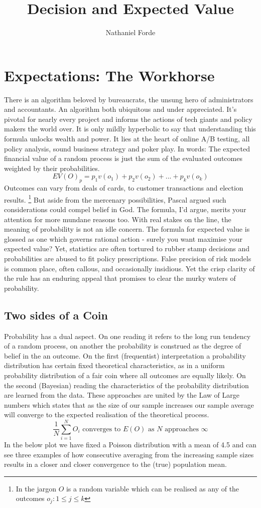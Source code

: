 \documentclass[10pt,a4paper,notitlepage, twocolumn]{article}
\author{Nathaniel Forde}
\title{Decision and Expected Value}
\begin{document}
\section*{Expectations: The Workhorse}
There is an algorithm beloved by bureaucrats, the unsung hero of administrators and accountants. An algorithm  both ubiquitous and under appreciated. It's pivotal for nearly every project and informs the actions of tech giants and policy makers the world over. It is only mildly hyperbolic to say that understanding this formula unlocks wealth and power. It lies at the heart of online A/B testing, all policy analysis, sound business strategy and poker play. In words: The expected financial value of a random process is just the sum of the evaluated outcomes weighted by their probabilities. 
$$ EV(O)_{p} = p_{1}v(o_{1}) + p_{2}v(o_{2}) + ... + p_{k}v(o_{k}) $$
Outcomes can vary from deals of cards, to customer transactions and election results. \footnote{In the jargon $O$ is a random variable which can be realised as any of the outcomes  $ o_{j} :  1 \leq j \leq k$} But aside from the mercenary possibilities, Pascal argued such considerations could compel belief in God. The formula, I'd argue, merits your attention for more mundane reasons too. With real stakes on the line, the meaning of probability is not an idle concern. The formula for expected value is glossed as one which governs rational action - surely you want maximise your expected value? Yet, statistics are often tortured to rubber stamp decisions and probabilities are abused to fit policy prescriptions. False precision of risk models is common place, often callous, and occasionally insidious. Yet the crisp clarity of the rule has an enduring appeal that promises to clear the murky waters of probability.

\subsection*{Two sides of a Coin}
Probability has a dual aspect. On one reading it refers to the long run tendency of a random process, on another the probability is construed as the degree of belief in the an outcome. On the first (frequentist) interpretation a probability distribution has certain fixed theoretical characteristics, as in a uniform probability distribution of a fair coin where all outcomes are equally likely. On the second (Bayesian) reading the characteristics of the probability distribution are learned from the data. These approaches are united by the Law of Large numbers which states that as the size of our sample increases our sample average will converge to the expected realisation of the theoretical process.
$$  \frac{1}{N} \sum_{i = 1}^{N} O_{i} \text{ converges to }  E(O) \text{ as } N \text{ approaches } \infty $$ 
In the below plot we have fixed a Poisson distribution with a mean of 4.5 and can see three examples of how consecutive averaging from the increasing sample sizes results in a closer and closer convergence to the (true) population mean.
\end{document}
